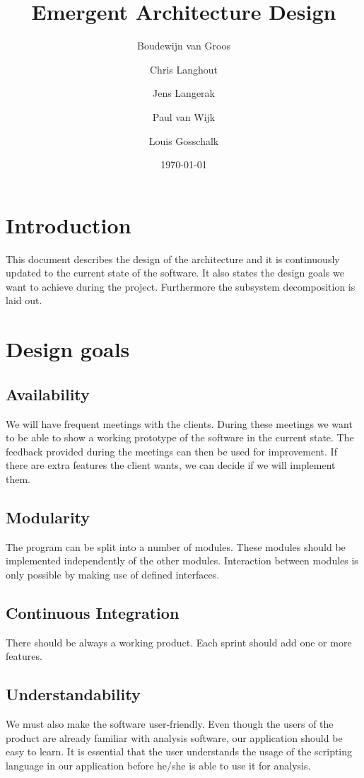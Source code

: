 \documentclass[a4paper]{article}
\title{Emergent Architecture Design}
\author[1]{Boudewijn van Groos}
\author[2]{Chris Langhout}
\author[3]{Jens Langerak}
\author[4]{Paul van Wijk}
\author[5]{Louis Gosschalk}
\affil[1]{bvangroos \\
4229843}
\affil[2]{clanghout \\
4281705}
\affil[3]{jlangerak \\
4317327}
\affil[4]{pjvanwijk \\
4285034}
\affil[5]{lgosschalk \\
4214528}
\date{\today}
\begin{document}
\maketitle
\tableofcontents
\newpage

\section{Introduction}
This document describes the design of the architecture and it is continuously updated to the current state of the software. It also states the design goals we want to achieve during the project. Furthermore the subsystem decomposition is laid out.

\section{Design goals}

\subsection{Availability}
We will have frequent meetings with the clients. During these meetings we want to be able to show a working prototype of the software in the current state. The feedback provided during the meetings can then be used for improvement. If there are extra features the client wants, we can decide if we will implement them.

\subsection{Modularity}
The program can be split into a number of modules. These modules should be implemented independently of the other modules. Interaction between modules is only possible by making use of defined interfaces.

\subsection{Continuous Integration}
There should be always a working product. Each sprint should add one or more features.

\subsection{Understandability}
We must also make the software user-friendly. Even though the users of the
product are already familiar with analysis software, our application should be
easy to learn. It is essential that the user understands the usage of the
scripting language in our application before he/she is able to use it for
analysis.
\end{document}

